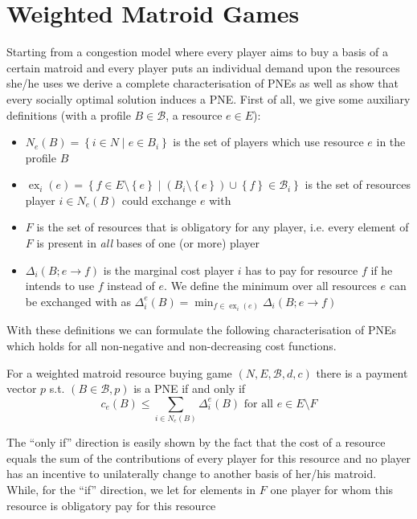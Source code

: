 \documentclass{scrartcl}
\theoremstyle{nonumberplain}
\newcommand{\tupel}[1]{\left(#1\right)}
\newcommand{\set}[1]{\left\{#1\right\}}
\DeclareMathOperator{\ex}{ex}
\begin{document}
\section{Weighted Matroid Games}
Starting from a congestion model where every player aims to buy a basis of
a certain matroid and every player puts an individual demand upon the resources
she/he uses we derive a complete characterisation of PNEs as well as show that
every socially optimal solution induces a PNE. First of all, we give some
auxiliary definitions (with a profile $B\in\mathcal{B}$, a resource $e\in E$):
\begin{itemize}
  \item $N_{e}(B) = \set{i\in N\middle| e\in B_{i}}$ is the set of players
    which use resource $e$ in the profile $B$
  \item $\ex_{i}(e) = \set{f\in E\setminus\set{e}\middle|
    (B_{i}\setminus\set{e})\cup\set{f}\in\mathcal{B}_{i}}$ is the set of
    resources player $i\in N_{e}(B)$ could exchange $e$ with
  \item $F$ is the set of resources that is obligatory for any player, i.e.
    every element of $F$ is present in \emph{all} bases of one (or more) player
  \item $\Delta_{i}\tupel{B;e\rightarrow f}$ is the marginal cost player $i$
    has to pay for resource $f$ if he intends to use $f$ instead of $e$.
    We define the minimum over all resources $e$ can be exchanged with as
    $\Delta_{i}^{e}(B) = \min_{f\in\ex_{i}(e)}\Delta_{i}(B;e\rightarrow f)$
\end{itemize}
With these definitions we can formulate the following characterisation of
PNEs which holds for all non-negative and non-decreasing cost functions.
\begin{theo}
  For a weighted matroid resource buying game $\tupel{N, E, \mathcal{B}, d, c}$
  there is a payment vector $p$ s.t. $\tupel{B\in\mathcal{B}, p}$ is a PNE
  if and only if
  \begin{equation*}
    c_{e}(B)\leq\sum_{i\in N_{e}(B)}\Delta_{i}^{e}(B) \text{ for all } e\in
    E\setminus F
  \end{equation*}
\end{theo}
The \enquote{only if} direction is easily shown by the fact that the cost
of a resource equals the sum of the contributions of every player for this
resource and no player has an incentive to unilaterally change to another basis
of her/his matroid. While, for the \enquote{if} direction, we let for elements
in $F$ one player for whom this resource is obligatory pay for this resource
\end{document}
